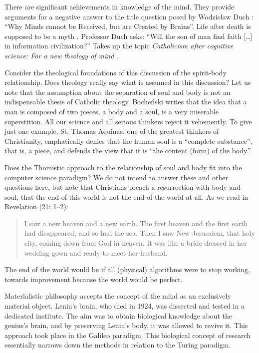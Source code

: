 \documentclass[pdftex,12pt]{article}
\begin{document}
There are significant achievements in knowledge of the mind. They provide arguments for a negative answer to the title question posed by Wodzisław Duch \parencite*{duch_why_2017}
: ``Why Minds cannot be Received, but are Created by Brains''. Life after death is supposed to be a  myth \parencite{MartinAugustine2015}. Professor Duch asks: ``Will the son of man find faith [\dots] in information civilization?'' Takes up the topic \emph{Catholicism after cognitive science: For a new theology of mind} \parencites{duch_katolicyzm_2015}[see also][]{slomka_neuronauki_2012}.

Consider the theological foundations of this discussion of the spirit-body relationship. Does theology really say what is assumed in this discussion? Let us note that the assumption about the separation of soul and body is not an indispensable thesis of Catholic theology. Bocheński \parencite*{Bochenski1994} writes   that the idea that a man is composed of two pieces, a body and a soul, is a very miserable superstition.   All our science and all serious thinkers reject it vehemently. To give just one example, St. Thomas Aquinas, one of the greatest thinkers of Christianity, emphatically denies that the human soul is a ``complete substance'', that is, a piece, and defends the view that it is ``the content (form) of the body.''

Does the Thomistic approach to the relationship of soul and body fit into the computer science paradigm? We do not intend to answer these and other questions here, but note that Christians preach a resurrection with body and soul, that the end of this world is not the end of the world at all. As we read in Revelation (21: 1--2): \begin{quote} \small I saw a new heaven and a new earth. The first heaven and the first earth had disappeared, and so had the sea.  Then I saw New Jerusalem, that holy city, coming down from God in heaven. It was like a bride dressed in her wedding gown and ready to meet her husband. \end{quote} The end of the world would be if all (physical) algorithms were to stop working, towards improvement because the world would be perfect.


 Materialistic philosophy accepts the concept of the mind as an exclusively material object. Lenin's brain, who died in 1924, was dissected and tested in a dedicated institute. The aim was to obtain biological knowledge about the genius's brain, and by preserving Lenin's body, it was allowed to revive it. This approach took place in the Galileo paradigm. This biological concept of research essentially narrows down the methods in relation to the Turing paradigm.
\end{document}
